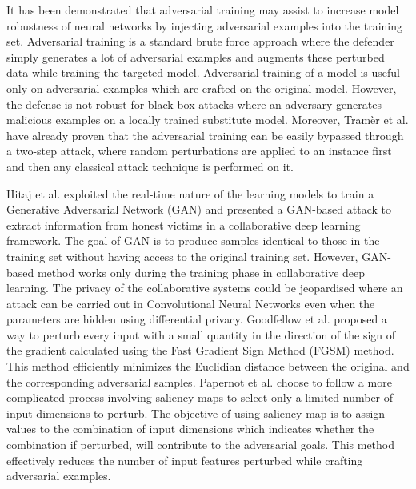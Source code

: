 It has been demonstrated \cite{Szegedy13,Goodfellow14, LyuHL15, ShokriSSS17, ShahamYN18} that adversarial training may assist to increase model robustness of neural networks by injecting adversarial examples into the training set. Adversarial training is a standard brute force approach where the defender simply generates a lot of adversarial examples and augments these perturbed data while training the targeted model. Adversarial training of a model is useful only on adversarial examples which are crafted on the original model. However, the defense is not robust for black-box attacks \cite{NarodytskaK17, PapernotMGJCS17} where an adversary generates malicious examples on a locally trained substitute model. Moreover, Tram{\`{e}}r et al. \cite{TramerKPBM17} have already proven that the adversarial training can be easily bypassed through a two-step attack, where random perturbations are applied to an instance first and then any classical attack technique is performed on it.

Hitaj et al. \cite{HitajAP17} exploited the real-time nature of the learning models to train a Generative Adversarial Network (GAN) and presented a GAN-based attack to extract information from honest victims in a collaborative deep learning framework. The goal of GAN is to produce samples identical to those in the training set without having access to the original training set. However, GAN-based method works only during the training phase in collaborative deep learning. The privacy of the collaborative systems could be jeopardised where an attack can be carried out in Convolutional Neural Networks even when the parameters are hidden using differential privacy. Goodfellow et al. \cite{Goodfellow14} proposed a way to perturb every input with a small quantity in the direction of the sign of the gradient calculated using the Fast Gradient Sign Method (FGSM) method. This method efficiently minimizes the Euclidian distance between the original and the corresponding adversarial samples. Papernot et al. \cite{PapernotMJFCS16} choose to follow a more complicated process involving saliency maps to select only a limited number of input dimensions to perturb. The objective of using saliency map is to assign values to the combination of input dimensions which indicates whether the combination if perturbed, will contribute to the adversarial goals. This method effectively reduces the number of input features perturbed while crafting adversarial examples.

